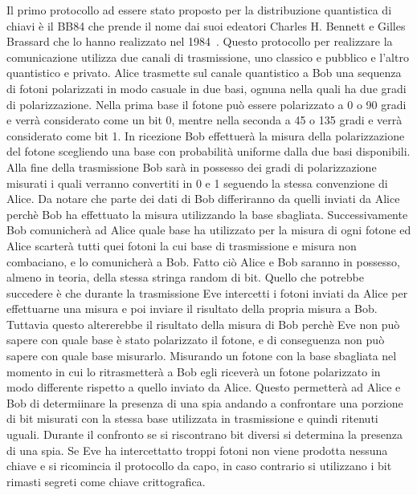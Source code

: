 Il primo protocollo ad essere stato proposto per la distribuzione quantistica di chiavi \`e il BB84 che prende il nome dai suoi edeatori Charles H. Bennett e Gilles Brassard che lo hanno realizzato nel 1984~\cite{ Bennett_2014}.
Questo protocollo per realizzare la comunicazione utilizza due canali di trasmissione, uno classico e pubblico e l'altro quantistico e privato. Alice trasmette sul canale quantistico a Bob una sequenza di fotoni polarizzati in modo casuale in due basi, ognuna nella quali ha due gradi di polarizzazione. Nella prima base il fotone pu\`o essere polarizzato a 0 o 90 gradi e verr\`a considerato come un bit 0, mentre nella seconda a 45 o 135 gradi e verr\`a considerato come bit 1.
In ricezione Bob effettuer\`a la misura della polarizzazione del fotone scegliendo una base con probabilit\`a uniforme dalla due basi disponibili. Alla fine della trasmissione Bob sar\`a in possesso dei gradi di polarizzazione misurati i quali verranno convertiti in 0 e 1 seguendo la stessa convenzione di Alice. Da notare che parte dei dati di Bob differiranno da quelli inviati da Alice perch\`e Bob ha effettuato la misura utilizzando la base sbagliata.
Successivamente Bob comunicher\`a ad Alice quale base ha utilizzato per la misura di ogni fotone ed Alice scarter\`a tutti quei fotoni la cui base di trasmissione e misura non combaciano, e lo comunicher\`a a Bob. Fatto ci\`o Alice e Bob saranno in possesso, almeno in teoria, della stessa stringa random di bit.
Quello che potrebbe succedere \`e che durante la trasmissione Eve intercetti i fotoni inviati da Alice per effettuarne una misura e poi inviare il risultato della propria misura a Bob. Tuttavia questo altererebbe il risultato della misura di Bob perch\`e Eve non pu\`o sapere con quale base \`e stato polarizzato il fotone, e di conseguenza non pu\`o sapere con quale base misurarlo. Misurando un fotone con la base sbagliata nel momento in cui lo ritrasmetter\`a a Bob egli ricever\`a un fotone polarizzato in modo differente rispetto a quello inviato da Alice. Questo permetter\`a ad Alice e Bob di determiinare la presenza di una spia andando a confrontare una porzione di bit misurati con la stessa base utilizzata in trasmissione e quindi ritenuti uguali. Durante il confronto se si riscontrano bit diversi si determina la presenza di una spia. Se Eve ha intercettatto troppi fotoni non viene prodotta nessuna chiave e si ricomincia il protocollo da capo, in caso contrario si utilizzano i bit rimasti segreti come chiave crittografica\cite{zhao_development_2018}.

